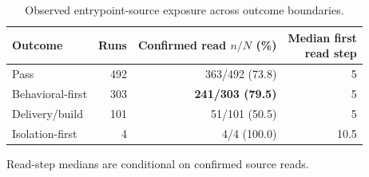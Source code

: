 \begin{table}[tbp]
  \centering
    \caption{Observed entrypoint-source exposure across outcome boundaries.}
    \label{tab:source-exposure}

    \centering
    \footnotesize

    \begin{tabular}{@{}lrrr@{}}
      \toprule
      Outcome
        & Runs
        & \shortstack{Confirmed read\\$n/N$ (\%)}
        & \shortstack{Median first\\read step} \\
      \midrule
      Pass & 492 & 363/492 (73.8) & 5 \\
      Behavioral-first & 303 & \textbf{241/303 (79.5)} & 5 \\
      Delivery/build & 101 & 51/101 (50.5) & 5 \\
      Isolation-first & 4 & 4/4 (100.0) & 10.5 \\

      \bottomrule
    \end{tabular}

    \par\smallskip
    {\scriptsize
    Read-step medians are conditional on confirmed source reads.
    }
\end{table}
